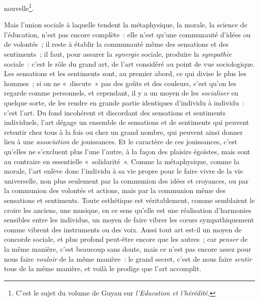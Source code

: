 \documentclass[french,twoside]{book} %
\begin{document}
nouvelle\footnote{ C’est le sujet du volume de Guyau sur \emph{l’Education et l’hérédité}.}.\par
Mais l’union sociale à laquelle tendent la métaphysique, la morale, la science de l’éducation, n’est pas encore complète : elle n’est qu’une communauté d’idées ou de volontés ; il reste à établir la communauté même des sensations et des sentiments ; il faut, pour assurer la \emph{synergie} sociale, produire la \emph{sympathie} sociale : c’est le rôle du grand art, de l’art considéré au point de vue sociologique. Les sensations et les sentiments sont, au premier abord, ce qui divise le plus les hommes ; si on ne « discute » pas des goûts et des couleurs, c’est qu’on les regarde comme personnels, et cependant, il y a un moyen de les \emph{socialiser} en quelque sorte, de les rendre en grande partie identiques d’individu à individu : c’est l’art. Du fond incohérent et discordant des sensations et sentiments individuels, l’art dégage un ensemble de sensations et de sentiments qui peuvent retentir chez tous à la fois ou chez un grand nombre, qui peuvent ainsi donner lieu à une \emph{association} de jouissances. Et le caractère de ces jouissances, c’est qu’elles ne s’excluent plus l’une l’autre, à la façon des plaisirs égoïstes, mais sont au contraire en essentielle « solidarité ». Comme la métaphysique, comme la morale, l’art enlève donc l’individu à sa vie propre pour le faire vivre de la vie universelle, non plus seulement par la communion des idées et croyances, ou par la communion des volontés et actions, mais par la communion même des sensations et sentiments. Toute esthétique est véritablement, comme semblaient le croire les anciens, une musique, en ce sens qu’elle est une réalisation d’harmonies sensibles entre les individus, un moyen de faire vibrer les cœurs sympathiquement comme vibrent des instruments ou des voix. Aussi tout art est-il un moyen de concorde sociale, et plus profond peut-être encore que les autres ; car \emph{penser} de la même manière, c’est beaucoup sans doute, mais ce n’est pas encore assez pour nous faire \emph{vouloir} de la même manière : le grand secret, c’est de nous faire \emph{sentir} tous de la même manière, et voilà le prodige que l’art accomplit.\par
\end{document}
